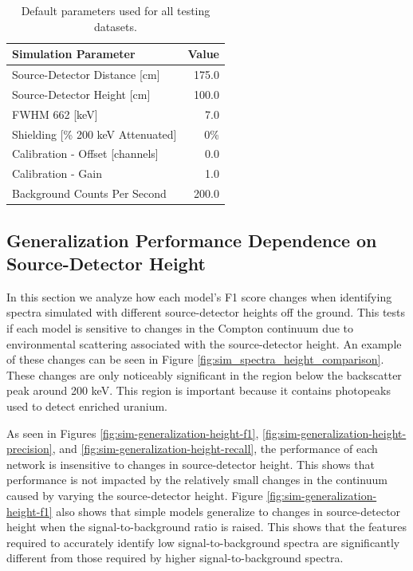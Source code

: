 \begin{table}[H]
\centering
\caption{Default parameters used for all testing datasets.}
\label{table:default_sim_params}
\begin{tabular}{lr}
\hline
\textbf{Simulation Parameter} &  \textbf{Value} \\ \hline
Source-Detector Distance [cm] & 175.0\\ 
Source-Detector Height [cm] & 100.0\\ 
FWHM 662 [keV] & 7.0\\ 
Shielding [\% 200 keV Attenuated] & 0\% \\ 
Calibration - Offset [channels] & 0.0 \\ 
Calibration - Gain & 1.0 \\ 
Background Counts Per Second & 200.0 \\ \hline 
\end{tabular}
\end{table}


\subsection{Generalization Performance Dependence on Source-Detector Height}

In this section we analyze how each model's F1 score changes when identifying spectra simulated with different source-detector heights off the ground. This tests if each model is sensitive to changes in the Compton continuum due to environmental scattering associated with the source-detector height. An example of these changes can be seen in Figure \ref{fig:sim_spectra_height_comparison}. These changes are only noticeably significant in the region below the backscatter peak around 200 keV. This region is important because it contains photopeaks used to detect enriched uranium.

As seen in Figures \ref{fig:sim-generalization-height-f1}, \ref{fig:sim-generalization-height-precision}, and \ref{fig:sim-generalization-height-recall}, the performance of each network is insensitive to changes in source-detector height. This shows that performance is not impacted by the relatively small changes in the continuum caused by varying the source-detector height. Figure \ref{fig:sim-generalization-height-f1} also shows that simple models generalize to changes in source-detector height when the signal-to-background ratio is raised. This shows that the features required to accurately identify low signal-to-background spectra are significantly different from those required by higher signal-to-background spectra. 


